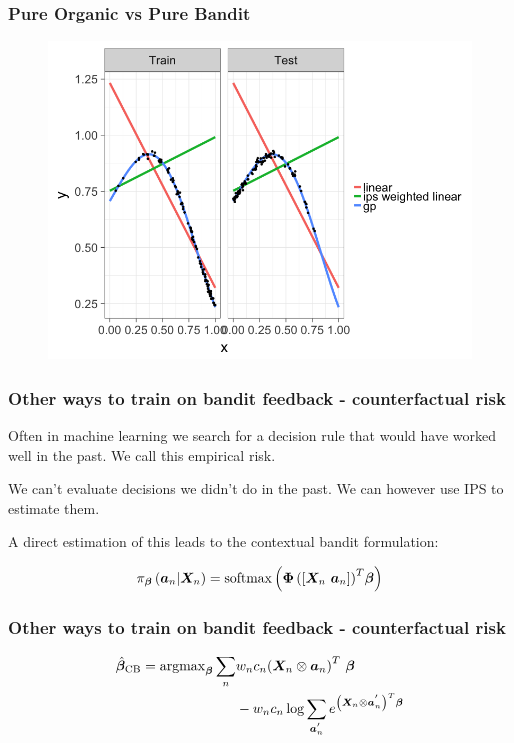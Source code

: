\begin{frame}
  \frametitle{Pure Organic vs Pure Bandit}
\begin{figure}[h!]
\includegraphics[scale=0.4]{images/two_linear_models_and_gp5.png}
\centering
\end{figure}
\end{frame}


\begin{frame}
  \frametitle{Other ways to train on bandit feedback - counterfactual risk}

  Often in machine learning we search for a decision rule that would have worked well in the past.  \pause We call this empirical risk.

  \pause

  We can't evaluate decisions we didn't do in the past.  \pause We can however use IPS to estimate them.

  \pause

  A direct estimation of this leads to the contextual bandit formulation:

  \pause


  \[
    \pi_{\bm{\beta}}\left( {\bm{a}}_n | {\bm{X}}_n \right) = {\rm softmax}
      \left( {\bm{\Phi}
        \left(
          \left[ \bm{X}_n ~ \bm{a}_n \right]
        \right)}^T \bm{\beta}
      \right)
  \]  

\end{frame}


\begin{frame}
  \frametitle{Other ways to train on bandit feedback - counterfactual risk}

\begin{align*}
	\hat{\bm{\beta}}_{\rm CB} = {\rm argmax}_{\bm{\beta}} \sum_n
	& w_n c_n
		{\left(
			{\bm{X}}_n \otimes {\bm{a}}_n
		\right)}^T ~ \bm{\beta} \\
	& - w_n c_n \log \sum_{{\bm{a}}_{n}^{'}} e^{
						{\left(
							{\bm{X}}_n \otimes {\bm{a}}_{n}^{'}
						\right)}^T \bm{\beta}
						} \\
\end{align*}

\pause


\end{frame}



